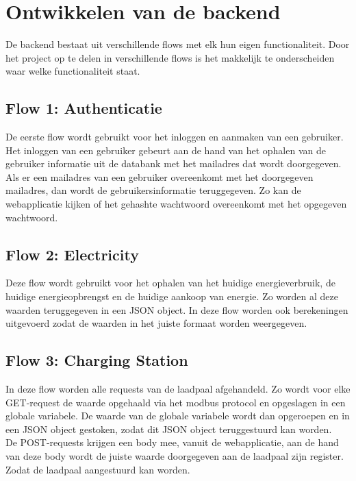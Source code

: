 \section{Ontwikkelen van de backend}
\label{sec:proefopstelling-backend}

De backend bestaat uit verschillende flows met elk hun eigen functionaliteit. Door het project op te delen in verschillende flows is het makkelijk te onderscheiden waar welke functionaliteit staat.

\subsection{Flow 1: Authenticatie}
\label{subsec:proefopstelling-authenticatie}

De eerste flow wordt gebruikt voor het inloggen en aanmaken van een gebruiker. Het inloggen van een gebruiker gebeurt aan de hand van het ophalen van de gebruiker informatie uit de databank met het mailadres dat wordt doorgegeven. Als er een mailadres van een gebruiker overeenkomt met het doorgegeven mailadres, dan wordt de gebruikersinformatie teruggegeven. Zo kan de webapplicatie kijken of het gehashte wachtwoord overeenkomt met het opgegeven wachtwoord.

\subsection{Flow 2: Electricity}
\label{subsec:proefopstelling-electricity}

Deze flow wordt gebruikt voor het ophalen van het huidige energieverbruik, de huidige energieopbrengst en de huidige aankoop van energie. Zo worden al deze waarden teruggegeven in een JSON object. In deze flow worden ook berekeningen uitgevoerd zodat de waarden in het juiste formaat worden weergegeven.

\subsection{Flow 3: Charging Station}
\label{subsec:proefopstelling-charging-station}

In deze flow worden alle requests van de laadpaal afgehandeld. Zo wordt voor elke GET-request de waarde opgehaald via het modbus protocol en opgeslagen in een globale variabele. De waarde van de globale variabele wordt dan opgeroepen en in een JSON object gestoken, zodat dit JSON object teruggestuurd kan worden.\\

De POST-requests krijgen een body mee, vanuit de webapplicatie, aan de hand van deze body wordt de juiste waarde doorgegeven aan de laadpaal zijn register. Zodat de laadpaal aangestuurd kan worden.